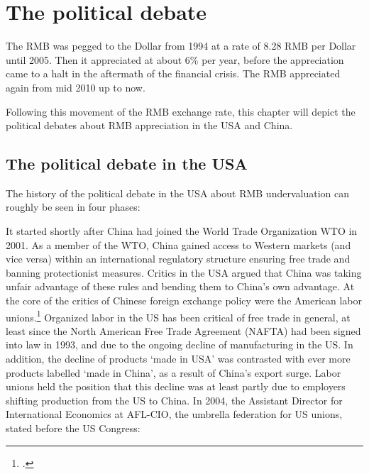 \section{The political debate}
\label{sec:politics}



The RMB was pegged to the Dollar from 1994 at a rate of 8.28 RMB per 
Dollar until 2005. Then it appreciated at about 6\% per year, before the 
appreciation came to a halt in the aftermath of the financial crisis.  
The RMB appreciated again from mid 2010 up to now.

Following this movement of the RMB exchange rate, this chapter will 
depict the political debates about RMB appreciation in the USA and 
China.


\subsection{The political debate in the USA}

The history of the political debate in the USA about RMB undervaluation 
can roughly be seen in four phases:

It started shortly after China had joined the World Trade Organization 
WTO in 2001. As a member of the WTO, China gained access to Western 
markets (and vice versa) within an international regulatory structure 
ensuring free trade and banning protectionist measures. Critics in the 
USA argued that China was taking unfair advantage of these rules and 
bending them to China's own advantage. At the core of the critics of 
Chinese foreign exchange policy were the American labor 
unions.\footnote{\cite[pp. 14]{Levy2011}.} Organized labor in the US has 
been critical of free trade in general, at least since the North 
American Free Trade Agreement (NAFTA) had been signed into law in 1993, 
and due to the ongoing decline of manufacturing in the US. In addition, 
the decline of products `made in USA'  was contrasted with ever more 
products labelled `made in China', as a result of China's export surge. 
Labor unions held the position that this decline was at least partly due 
to employers shifting production from the US to China. In 2004, the 
Assistant Director for International Economics at AFL-CIO, the umbrella 
federation for US unions, stated before the US Congress: 

